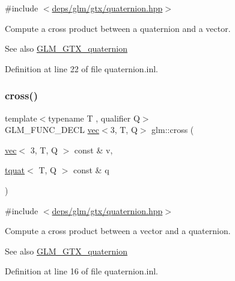 {\ttfamily \#include $<$\hyperlink{gtx_2quaternion_8hpp}{deps/glm/gtx/quaternion.\+hpp}$>$}

Compute a cross product between a quaternion and a vector.

\begin{DoxySeeAlso}{See also}
\hyperlink{group__gtx__quaternion}{G\+L\+M\+\_\+\+G\+T\+X\+\_\+quaternion} 
\end{DoxySeeAlso}


Definition at line 22 of file quaternion.\+inl.

\mbox{\label{group__gtx__quaternion_gaa75ca5654e0dc3b61c05db091f7d46ce}} 
\subsubsection{\texorpdfstring{cross()}{cross()}\hspace{0.1cm}{\footnotesize\ttfamily [2/2]}}
{\footnotesize\ttfamily template$<$typename T , qualifier Q$>$ \\
G\+L\+M\+\_\+\+F\+U\+N\+C\+\_\+\+D\+E\+CL \hyperlink{structglm_1_1vec}{vec}$<$3, T, Q$>$ glm\+::cross (\begin{DoxyParamCaption}\item[{\hyperlink{structglm_1_1vec}{vec}$<$ 3, T, Q $>$ const \&}]{v,  }\item[{\hyperlink{structglm_1_1tquat}{tquat}$<$ T, Q $>$ const \&}]{q }\end{DoxyParamCaption})}



{\ttfamily \#include $<$\hyperlink{gtx_2quaternion_8hpp}{deps/glm/gtx/quaternion.\+hpp}$>$}

Compute a cross product between a vector and a quaternion.

\begin{DoxySeeAlso}{See also}
\hyperlink{group__gtx__quaternion}{G\+L\+M\+\_\+\+G\+T\+X\+\_\+quaternion} 
\end{DoxySeeAlso}


Definition at line 16 of file quaternion.\+inl.

\mbox{\label{group__gtx__quaternion_ga72275e87ce62dc75a06d39a6c049835c}} 
